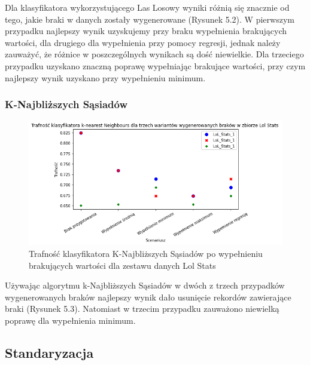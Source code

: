 \documentclass{book}
\begin{document}
    Dla klasyfikatora wykorzystującego Las Losowy wyniki różnią się znacznie od tego, jakie braki w danych zostały wygenerowane (Rysunek 5.2). W pierwszym 
    przypadku najlepszy wynik uzyskujemy przy braku wypełnienia brakujących wartości, dla drugiego dla wypełnienia przy pomocy regresji, jednak należy zauważyć, 
    że różnice w poszczególnych wynikach są dość niewielkie. Dla trzeciego przypadku uzyskano znaczną poprawę wypełniając brakujące wartości, przy czym najlepszy 
    wynik uzyskano przy wypełnieniu minimum.

\subsubsection{K-Najbliższych Sąsiadów}
    \begin{figure}[H]
    \centerline{\includegraphics[scale=0.5]{Lol_stats_knn_Wypełnienie_brakujących}}
    \centering
    \caption{Trafność klasyfikatora K-Najbliższych Sąsiadów po wypełnieniu brakujących wartości dla zestawu danych Lol Stats}
    \end{figure}

    Używając algorytmu k-Najbliższych Sąsiadów w dwóch z trzech przypadków wygenerowanych 
    braków najlepszy wynik dało usunięcie rekordów zawierające braki (Rysunek 5.3). Natomiast 
    w trzecim przypadku zauważono niewielką poprawę dla wypełnienia minimum.

\subsection{Standaryzacja}
\end{document}
